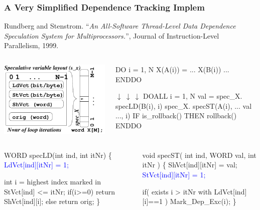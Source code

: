 \documentclass{beamer}
\newcommand{\blue}[1]{\textcolor{Blue}{{#1}}}
\newcommand{\emp}[1]{\textcolor{DikuRed}{ #1}}
\newcommand{\emphh}[1]{\textcolor{CosGreen}{ #1}}
\newcommand{\mymath}[1]{$ #1 $}
\begin{document}
\begin{frame}[fragile]
	\tableofcontents[currentsection]
\end{frame}

\begin{frame}[fragile,t]
  \frametitle{A Very Simplified Dependence Tracking Implem}

Rundberg and Stenstrom. ``{\em An All-Software Thread-Level Data Dependence Speculation System for Multiprocessors.}'', Journal of Instruction-Level Parallelism, 1999.\medskip

\begin{columns}
\includegraphics[width=28ex]{FigsTLS/SpecMemSeminal.pdf}
\vspace{-2ex}
\begin{colorcode}
\emp{DO} i = 1, N
  \emp{X(A(i))} = ... \emp{X(B(i))} ...
ENDDO

\mymath{\downarrow \ \downarrow \ \downarrow}
\emphh{DOALL} i = 1, N
  val = spec_X.\emphh{specLD(B(i), i)}
  spec_X.\emphh{specST(A(i), ... val ..., i)}
  IF is_rollback() THEN rollback()
ENDDO
\end{colorcode}
\end{columns}
\medskip\pause

\begin{columns}
\begin{colorcode}
\emphh{WORD specLD(int ind, int itNr)} \{
  \blue{LdVct[ind][itNr] = 1;}

  \emp{int i = highest index marked}
          \emp{in StVct[ind] <= itNr;}
  if(i>=0) return ShVct[ind][i];
  else return orig;
\}
\end{colorcode}
\begin{colorcode}
\emphh{void specST( int ind, WORD val, int itNr )} \{  
  ShVct[ind][itNr] = val;            
  \blue{StVct[ind][itNr]  = 1;}
  
  if( \emp{exists i > itNr with} 
         \emp{LdVct[ind][i]==1} )
    \alert{Mark_Dep_Exc(i);}
\}
\end{colorcode}
\end{columns}

\end{frame}
\end{document}
